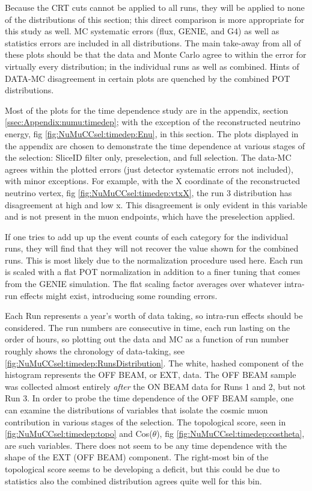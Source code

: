 \par Because the CRT cuts cannot be applied to all runs, they will be applied to none of the distributions of this section; this direct comparison is more appropriate for this study as well. MC systematic errors (flux, GENIE, and G4) as well as statistics errors are included in all distributions. The main take-away from all of these plots should be that the data and Monte Carlo agree to within the error for virtually every distribution; in the individual runs as well as combined. Hints of DATA-MC disagreement in certain plots are quenched by the combined POT distributions.

\par Most of the plots for the time dependence study are in the appendix, section \ref{ssec:Appendix:numu:timedep}; with the exception of the reconstructed neutrino energy, fig \ref{fig:NuMuCCsel:timedep:Enu}, in this section. The plots displayed in the appendix are chosen to demonstrate the time dependence at various stages of the selection: SliceID filter only, preselection, and full selection. The data-MC agrees within the plotted errors (just detector systematic errors not included), with minor exceptions. For example, with the X coordinate of the reconstructed neutrino vertex, fig \ref{fig:NuMuCCsel:timedep:vtxX}, the run 3 distribution has disagreement at high and low x. This disagreement is only evident in this variable and is not present in the muon endpoints, which have the preselection applied.

\par If one tries to add up up the event counts of each category for the individual runs, they will find that they will not recover the value shown for the combined runs. This is most likely due to the normalization procedure used here. Each run is scaled with a flat POT normalization in addition to a finer tuning that comes from the GENIE simulation. The flat scaling factor averages over whatever intra-run effects might exist, introducing some rounding errors.

\par Each Run represents a year's worth of data taking, so intra-run effects should be considered. The run numbers are consecutive in time, each run lasting on the order of hours, so plotting out the data and MC as a function of run number roughly shows the chronology of data-taking, see \cref{fig:NuMuCCsel:timedep:RunsDistribution}. The white, hashed component of the histogram represents the OFF BEAM, or EXT, data. The OFF BEAM sample was collected almost entirely \textit{after} the ON BEAM data for Runs 1 and 2, but not Run 3. In order to probe the time dependence of the OFF BEAM sample, one can examine the distributions of variables that isolate the cosmic muon contribution in various stages of the selection. The topological score, seen in \cref{fig:NuMuCCsel:timedep:topo} and Cos($\theta$), fig \ref{fig:NuMuCCsel:timedep:costheta}, are such variables. There does not seem to be any time dependence with the shape of the EXT (OFF BEAM) component. The right-most bin of the topological score seems to be developing a deficit, but this could be due to statistics also the combined distribution agrees quite well for this bin.

